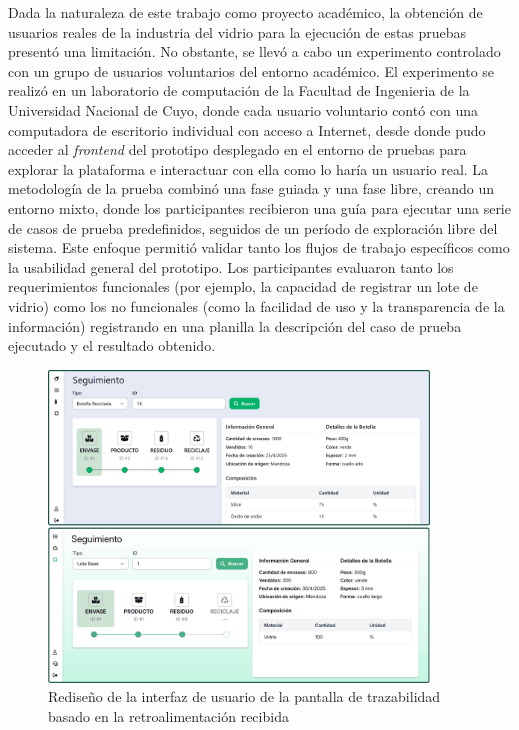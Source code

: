 Dada la naturaleza de este trabajo como proyecto académico, la obtención de usuarios reales de la industria del vidrio para la ejecución de estas pruebas presentó una limitación. No obstante, se llevó a cabo un experimento controlado con un grupo de usuarios voluntarios del entorno académico. El experimento se realizó en un laboratorio de computación de la Facultad de Ingenieria de la Universidad Nacional de Cuyo, donde cada usuario voluntario contó con una computadora de escritorio individual con acceso a Internet, desde donde pudo acceder al \textit{\gls{frontend}} del prototipo desplegado en el entorno de pruebas para explorar la plataforma e interactuar con ella como lo haría un usuario real. La metodología de la prueba combinó una fase guiada y una fase libre, creando un entorno mixto, donde los participantes recibieron una guía para ejecutar una serie de casos de prueba predefinidos, seguidos de un período de exploración libre del sistema. Este enfoque permitió validar tanto los flujos de trabajo específicos como la usabilidad general del prototipo. Los participantes evaluaron tanto los requerimientos funcionales (por ejemplo, la capacidad de registrar un lote de vidrio) como los no funcionales (como la facilidad de uso y la transparencia de la información) registrando en una planilla la descripción del caso de prueba ejecutado y el resultado obtenido.

\begin{figure}[!htb]
\centering
\includegraphics[width=0.9\textwidth]{Figures/uat-ui-redesign.png}
\caption{Rediseño de la interfaz de usuario de la pantalla de trazabilidad basado en la retroalimentación recibida}
\label{fig:uat-ui-redesign}
\end{figure}

